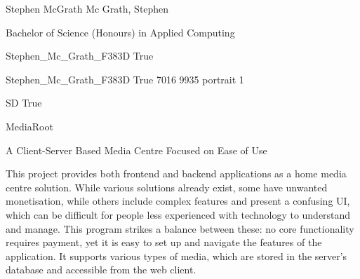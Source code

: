 
\begingroup{}\relax



\def\Key{Stephen_Mc_Grath_F383D}

{Stephen McGrath}
{Mc Grath, Stephen}

{Bachelor of Science (Honours) in Applied Computing}

{Stephen_Mc_Grath_F383D}
{True}

{Stephen_Mc_Grath_F383D}
{True}
{7016}
{9935}
{portrait}
{1}

{SD}
{True}

{MediaRoot}

{A Client-Server Based Media Centre Focused on Ease of Use}

{This project provides both frontend and backend applications as a home media centre solution. While various solutions already exist, some have unwanted monetisation, while others include complex features and present a confusing UI, which can be difficult for people less experienced with technology to understand and manage. This program strikes a balance between these: no core functionality requires payment, yet it is easy to set up and navigate the features of the application. It supports various types of media, which are stored in the server's database and accessible from the web client.}

